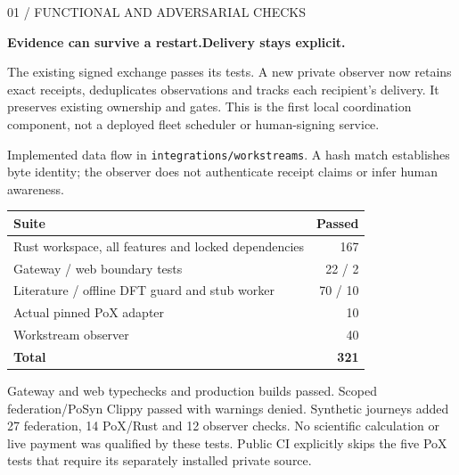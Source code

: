 \documentclass[10pt,a4paper]{article}
\newcommand{\sub}[1]{\vspace{2mm}{\large\sffamily\bfseries\color{ink}#1}\par}
\newcommand{\lead}[2]{{\small\sffamily\color{teal}#1}\par{\huge\sffamily\bfseries\color{ink}#2}\par\vspace{2mm}}
\begin{document}
\lead{01 / FUNCTIONAL AND ADVERSARIAL CHECKS}{Evidence can survive a restart.\newline Delivery stays explicit.}
The existing signed exchange passes its tests. A new private observer now retains
exact receipts, deduplicates observations and tracks each recipient's delivery.
It preserves existing ownership and gates. This is the first local coordination
component, not a deployed fleet scheduler or human-signing service.

\begin{center}
\end{center}
{\footnotesize\color{grey}Implemented data flow in \texttt{integrations/workstreams}. A hash match establishes byte identity; the observer does not authenticate receipt claims or infer human awareness.}

\sub{321 tests passed locally}
\begin{tabularx}{\textwidth}{@{}Yr@{}}\toprule
\textbf{Suite} & \textbf{Passed}\\\midrule
Rust workspace, all features and locked dependencies & 167\\
Gateway / web boundary tests & 22 / 2\\
Literature / offline DFT guard and stub worker & 70 / 10\\
Actual pinned PoX adapter & 10\\
Workstream observer & 40\\\midrule
\textbf{Total} & \textbf{321}\\\bottomrule
\end{tabularx}
Gateway and web typechecks and production builds passed. Scoped federation/PoSyn
Clippy passed with warnings denied. Synthetic journeys added 27 federation,
14 PoX/Rust and 12 observer checks. No scientific calculation or live payment
was qualified by these tests. Public CI explicitly skips the five PoX tests that
require its separately installed private source.
\end{document}
